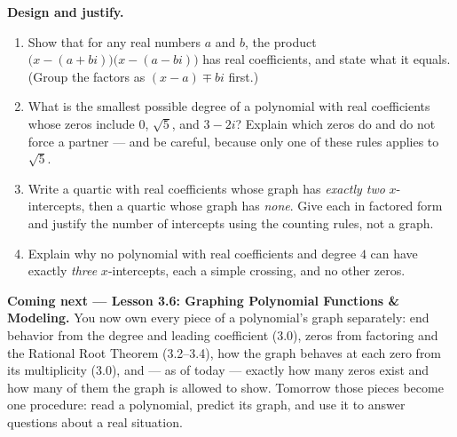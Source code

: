 \documentclass[10pt]{article}
\begin{document}
\begin{extensionbox}
\textbf{Design and justify.}
\begin{enumerate}[label=(\alph*), leftmargin=1.8em, itemsep=5pt]
  \item Show that for any real numbers $a$ and $b$, the product
        $\big(x-(a+bi)\big)\big(x-(a-bi)\big)$ has real coefficients, and state what it equals.
        (Group the factors as $(x-a) \mp bi$ first.)

  \item What is the smallest possible degree of a polynomial with real coefficients whose zeros
        include $0$, $\sqrt{5}$, and $3-2i$? Explain which zeros do and do not force a partner ---
        and be careful, because only one of these rules applies to $\sqrt{5}$.

  \item Write a quartic with real coefficients whose graph has \emph{exactly two} $x$-intercepts,
        then a quartic whose graph has \emph{none}. Give each in factored form and justify the number
        of intercepts using the counting rules, not a graph.

  \item Explain why no polynomial with real coefficients and degree $4$ can have exactly \emph{three}
        $x$-intercepts, each a simple crossing, and no other zeros.

\end{enumerate}
\end{extensionbox}

\begin{spiralbox}
\textbf{Coming next --- Lesson 3.6: Graphing Polynomial Functions \& Modeling.} You now own every
piece of a polynomial's graph separately: end behavior from the degree and leading coefficient
(3.0), zeros from factoring and the Rational Root Theorem (3.2--3.4), how the graph behaves at each
zero from its multiplicity (3.0), and --- as of today --- exactly how many zeros exist and how many of
them the graph is allowed to show. Tomorrow those pieces become one procedure: read a polynomial,
predict its graph, and use it to answer questions about a real situation.
\end{spiralbox}
\end{document}
